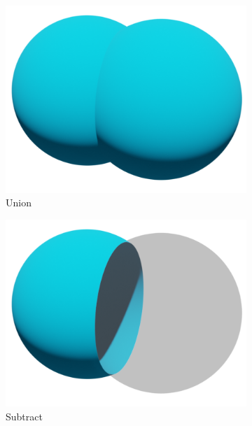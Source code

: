\begin{figure}
	\centering
	\begin{subfigure}[t]{0.3\textwidth}
		\centering
		\includegraphics[width=\textwidth]{Images/Union}
		\caption{Union}
	\end{subfigure}
	\hfill
	\begin{subfigure}[t]{0.3\textwidth}
		\centering
		\includegraphics[width=\textwidth]{Images/Subtract}
		\caption{Subtract}
	\end{subfigure}
	\hfill
	\begin{subfigure}[t]{0.3\textwidth}
		\centering

\end{subfigure}
\end{figure}
